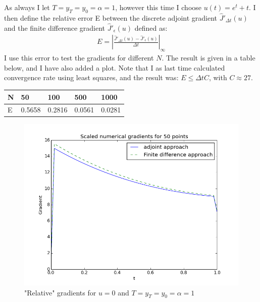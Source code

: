 \documentclass[11pt,a4paper]{article}
\begin{document}
As always I let $T=y_T=y_0=\alpha=1$, however this time I choose $u(t)=e^t+t$. I then define the relative error E between the discrete adjoint gradient $\hat{J}'_{\Delta t}(u)$ and the finite difference gradient $\hat{J}'_{\epsilon}(u)$ defined as:
\begin{align*}
E=|\frac{\hat{J}'_{\Delta t}(u)-\hat{J}'_{\epsilon}(u)}{\Delta t}|_{\infty}
\end{align*}
I use this error to test the gradients for different $N$. The result is given in a table below, and I have also added a plot. Note that I as last time calculated convergence rate using least squares, and the result was: $E\leq \Delta tC$, with $C\approx27$.
\begin{center}
    \begin{tabular}{| l | l | l | l | l |}
    \hline
    N & 50 & 100  & 500 & 1000 \\ \hline
    E & 0.5658 &0.2816 &0.0561 & 0.0281	\\ \hline
    \end{tabular}
\end{center}
\begin{figure}
  \includegraphics[width=\linewidth]{finite_diff_plot.png}
  \caption{"Relative" gradients for $u=0$ and $T=y_T=y_0=\alpha=1$}
  \label{Fig 2}
\end{figure}
\end{document}
